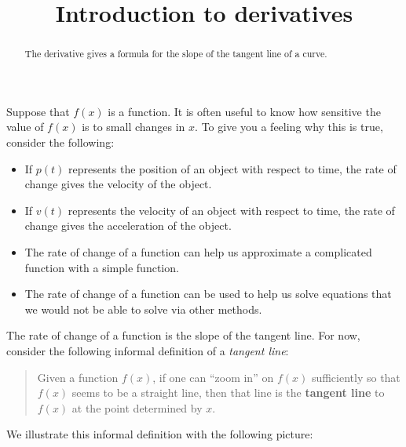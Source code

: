 \documentclass{ximera}
\title{Introduction to derivatives}
\begin{document}
\begin{abstract}
  The derivative gives a formula for the slope of the tangent line of a curve.
\end{abstract}
\maketitle


Suppose that $f(x)$ is a function.  It is often useful to know how
sensitive the value of $f(x)$ is to small changes in $x$. To give you
a feeling why this is true, consider the following:
\begin{itemize}
\item If $p(t)$ represents the position of an object with respect to
  time, the rate of change gives the velocity of the object.
\item If $v(t)$ represents the velocity of an object with respect to
  time, the rate of change gives the acceleration of the object.
\item The rate of change of a function can help us approximate a
  complicated function with a simple function.
\item The rate of change of a function can be used to help us solve
  equations that we would not be able to solve via other methods.
\end{itemize}

The rate of change of a function is the slope of the tangent line. For
now, consider the following informal definition of a \textit{tangent
  line}:
\begin{quote}
Given a function $f(x)$, if one can ``zoom in''
on $f(x)$ sufficiently so that $f(x)$ seems to be a straight line,
then that line is the \textbf{tangent line} to $f(x)$ at the point
determined by $x$.
\end{quote}
We illustrate this informal definition with the following picture:
\end{document}

